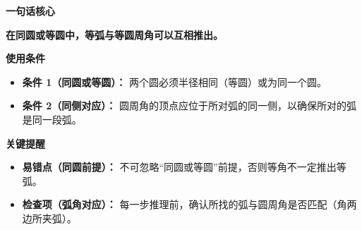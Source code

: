\begin{summarybox}
	\textbf{\textcolor{CSummary}{一句话核心}}

	\textbf{在同圆或等圆中，等弧与等圆周角可以互相推出。}

	\medskip
	\textbf{\textcolor{CSummary}{使用条件}}
	\begin{itemize}[leftmargin=*, itemsep=0.5em, topsep=0.4em]
		\item \textbf{条件 1（同圆或等圆）：} 两个圆必须半径相同（等圆）或为同一个圆。
		\item \textbf{条件 2（同侧对应）：} 圆周角的顶点应位于所对弧的同一侧，以确保所对的弧是同一段弧。
	\end{itemize}

	\medskip
	\textbf{\textcolor{CSummary}{关键提醒}}
	\begin{itemize}[leftmargin=*, itemsep=0.5em, topsep=0.4em]
		\item \textbf{易错点（同圆前提）：} 不可忽略“同圆或等圆”前提，否则等角不一定推出等弧。
		\item \textbf{检查项（弧角对应）：} 每一步推理前，确认所找的弧与圆周角是否匹配（角两边所夹弧）。
	\end{itemize}
\end{summarybox}
